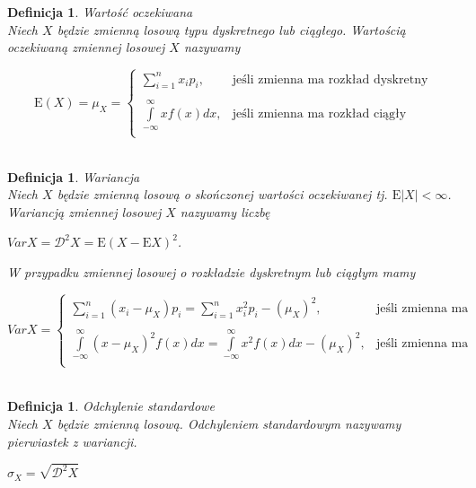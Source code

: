 \documentclass[12pt,a4paper]{report}
\newtheorem{definition}[theorem]{Definicja}
\begin{document}
\begin{definition}{Wartość oczekiwana \cite[Rozdział 2.6]{krysicki1999}\\}
Niech $X$ będzie zmienną losową typu dyskretnego lub ciągłego. Wartością oczekiwaną zmiennej losowej $X$ nazywamy 
\begin{center}
$$\displaystyle \mathrm{E}(X)=\mu_X=\left\{ \begin{array}{ll}
\sum\limits_{i=1}^{n} {x_ip_i}, & \textrm{jeśli zmienna ma rozkład dyskretny} \\\\
\int\limits_{-\infty}^{\infty} {xf(x)dx}, & \textrm{jeśli zmienna ma rozkład ciągły}\\
\end{array} \right.$$\\
\end{center}
\end{definition}

\begin{definition}{Wariancja \cite [Rozdział5.6]{jakubowski2004}\\}
Niech $X$ będzie zmienną losową o skończonej wartości oczekiwanej tj. $\mathrm{E}|X| < \infty$. Wariancją zmiennej losowej $X$ nazywamy liczbę
\begin{center}
$VarX= \mathcal{D}^2X=\mathrm{E}(X-\mathrm{E}X)^2$.\\
\end{center}
W przypadku zmiennej losowej o rozkładzie dyskretnym lub ciągłym mamy
\begin{center}
$$\displaystyle VarX=\left\{ \begin{array}{ll}
\sum\limits_{i=1}^{n} (x_i-\mu_X)p_i=\sum\limits_{i=1}^{n} x_{i}^2p_i-(\mu_X)^2, & \textrm{jeśli zmienna ma rozkład dyskretny} \\\\
\int\limits_{-\infty}^{\infty}(x-\mu_X)^2f(x)dx=\int\limits_{-\infty}^{\infty} x^{2}f(x)dx-(\mu_X)^2, & \textrm{jeśli zmienna ma rozkład ciągły}\\
\end{array} \right.$$\\
\end{center}
\end{definition}


\begin{definition}{Odchylenie standardowe \cite[Rozdział 5.6]{jakubowski2004}\\}
Niech $X$ będzie zmienną losową. Odchyleniem standardowym nazywamy pierwiastek z wariancji. 
\begin{center}
$\sigma_X=\sqrt{\mathcal{D}^2X}$\\
\end{center}
\end{definition}
\end{document}
